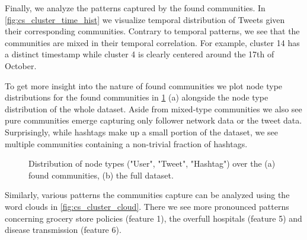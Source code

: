 Finally, we analyze the patterns captured by the found communities. 
In \cref{fig:cs_cluster_time_hist} we visualize temporal distribution of Tweets given their corresponding communities.
Contrary to temporal patterns, we see that the communities are mixed in their temporal correlation. 
For example, cluster 14 has a distinct timestamp while cluster 4 is clearly centered around the 17th of October. 

To get more insight into the nature of found communities we plot node type distributions for the found communities in \cref{fig:cs_cluster_type_dist} (a) alongside the node type distribution of the whole dataset.
Aside from mixed-type communities we also see pure communities emerge capturing only follower network data or the tweet data.
Surprisingly, while hashtags make up a small portion of the dataset, we see multiple communities containing a non-trivial fraction of hashtags.

\begin{figure}[!ht]
\centering
{}\quad
{}\quad
\caption{
    Distribution of node types ("User", "Tweet", "Hashtag") over the (a) found communities, (b) the full dataset.
}
\label{fig:cs_cluster_type_dist}
\end{figure}

Similarly, various patterns the communities capture can be analyzed using the word clouds in \cref{fig:cs_cluster_cloud}.
There we see more pronounced patterns concerning grocery store policies (feature 1), the overfull hospitals (feature 5) and disease transmission (feature 6).

